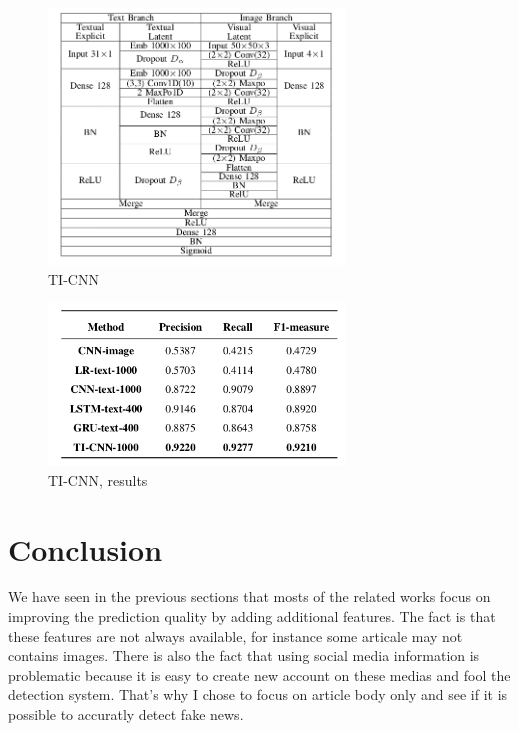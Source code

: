 \begin{figure}[h]
	\centering
	\includegraphics[width=0.7\textwidth]{images/chap1_bis/rev8.png}
	\caption{TI-CNN }
	\label{fig:chap1:yang2}
\end{figure}
\begin{figure}[h]
	\centering
	\includegraphics[width=0.7\textwidth]{images/chap1_bis/rev9.png}
	\caption{TI-CNN, results }
	\label{fig:chap1:yang3}
\end{figure}

\section{Conclusion}
We have seen in the previous sections that mosts of the related works focus on improving the prediction quality by adding additional features. The fact is that these features are not always available, for instance some articale may not contains images. There is also the fact that using social media information is problematic because it is easy to create new account on these medias and fool the detection system. That's why I chose to focus on article body only and see if it is possible to accuratly detect fake news. 